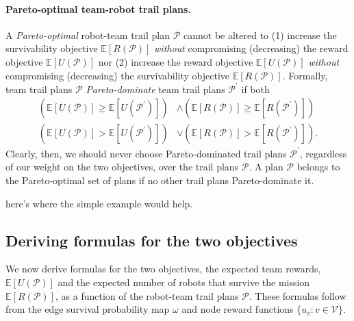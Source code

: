 \documentclass[11pt, oneside]{article}
\begin{document}
\paragraph{Pareto-optimal team-robot trail plans.} 
A \emph{Pareto-optimal} \cite{pardalos2017non} robot-team trail plan $\mathcal{P}$ cannot be altered to
(1) increase the survivability objective $\mathbb{E}[R(\mathcal{P})]$ \emph{without} compromising (decreasing) the reward objective $\mathbb{E}[U(\mathcal{P})]$
nor
(2) increase the reward objective $\mathbb{E}[U(\mathcal{P})]$ \emph{without} compromising (decreasing) the survivability objective $\mathbb{E}[R(\mathcal{P})]$.
Formally, team trail plans $\mathcal{P}$ \emph{Pareto-dominate} team trail plans  $\mathcal{P}^\prime$ if both
\begin{align}
	\left (\mathbb{E}[U(\mathcal{P})] \geq \mathbb{E}[U(\mathcal{P}^\prime)]  \right) & \wedge \left( \mathbb{E}[R(\mathcal{P})] \geq \mathbb{E}[R(\mathcal{P}^\prime)] \right) \\
	\left( \mathbb{E}[U(\mathcal{P})] > \mathbb{E}[U(\mathcal{P}^\prime)] \right) & \vee \left( \mathbb{E}[R(\mathcal{P})] > \mathbb{E}[R(\mathcal{P}^\prime)] \right).
\end{align}
Clearly, then, we should never choose Pareto-dominated trail plans $\mathcal{P}^\prime$, regardless of our weight on the two objectives, over the trail plans $\mathcal{P}$. A plan $\mathcal{P}$ belongs to the Pareto-optimal set of plans if no other trail plans Pareto-dominate it.


{\color{red} here's where the simple example would help.}


\subsection{Deriving formulas for the two objectives}
We now derive formulas for the two objectives, the expected team rewards, $\mathbb{E}[U(\mathcal{P})]$ and the expected number of robots that survive the mission $\mathbb{E}[R(\mathcal{P})]$, as a function of the robot-team trail plans $\mathcal{P}$. These formulas follow from the edge survival probability map $\omega$ and node reward functions $\{u_v : v \in \mathcal{V}\}$.
\end{document}
